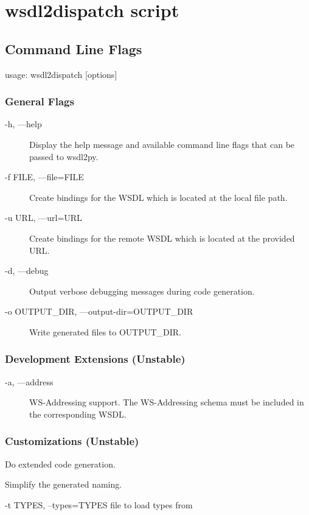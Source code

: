 \chapter{wsdl2dispatch script}

\section{Command Line Flags}

usage: wsdl2dispatch [options]

\subsection{General Flags}
\begin{description}
\item[-h, ---help] Display the help message and available command line
flags that can be passed to wsdl2py.
\item[-f FILE, ---file=FILE] Create bindings for the WSDL which is located at
the local file path.
\item[-u URL, ---url=URL] Create bindings for the remote WSDL which is located
at the provided URL.
\item[-d, ---debug] Output verbose debugging messages during code generation.
\item[-o OUTPUT_DIR, ---output-dir=OUTPUT_DIR] Write generated files to OUTPUT_DIR.
\end{description}

\subsection{Development Extensions (Unstable) }
\begin{description}
\item[-a, ---address] WS-Addressing support.  The WS-Addressing schema must be
included in the corresponding WSDL.
\end{description}

\subsection{Customizations (Unstable) }
\begin{description}
\item[-e, ---extended] Do extended code generation.
\item[-s, ---simple-naming] Simplify the generated naming.
\item{-t TYPES, --types=TYPES} file to load types from
\end{description}
